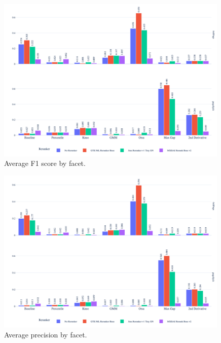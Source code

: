 \begin{figure}[htbp]
  \centering
  \includegraphics[width=0.99\textwidth]{reranker/avg_f1_score_bar_faceted.png}
  \caption{\footnotesize Average F1 score by facet.}
  \label{fig:avg_f1_score}
\end{figure}

\begin{figure}[htbp]
  \centering
  \includegraphics[width=0.99\textwidth]{reranker/avg_precision_bar_faceted.png}
  \caption{\footnotesize Average precision by facet.}
  \label{fig:avg_precision}
\end{figure}

